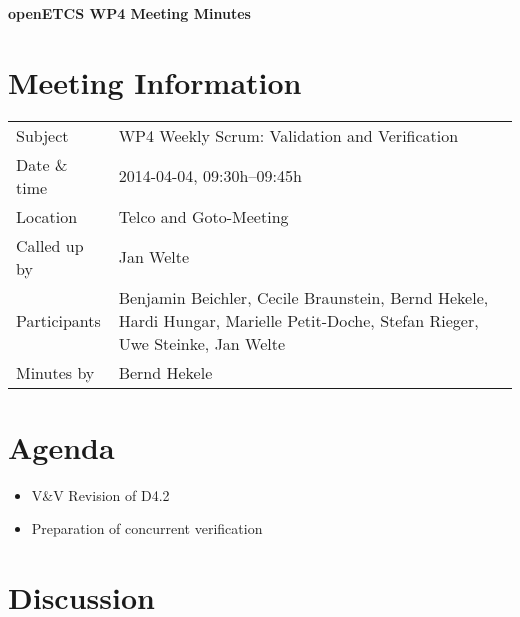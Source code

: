 \documentclass[a4paper, 11pt]{article}
\begin{document}
{\begin{center}\huge\bf openETCS WP4 Meeting Minutes\end{center}}
\section{Meeting Information}

\renewcommand{\arraystretch}{1.5}
\begin{supertabular}{m{.2\textwidth}m{.8\textwidth}}
Subject & WP4 Weekly Scrum: Validation and Verification\\
Date \& time & 2014-04-04, 09:30h--09:45h\\
Location & Telco and Goto-Meeting\\
Called up by & Jan Welte\\
Participants &
Benjamin Beichler,
Cecile Braunstein,
Bernd Hekele,
Hardi Hungar,
Marielle Petit-Doche,
Stefan Rieger,
Uwe Steinke,
Jan Welte
\\

Minutes by & Bernd Hekele\\

\end{supertabular}
\renewcommand{\arraystretch}{1.0}


\section{{Agenda}}
\begin{itemize}
\item V\&V Revision of D4.2
\item Preparation of concurrent verification
\end{itemize}

\section{Discussion}
\end{document}
